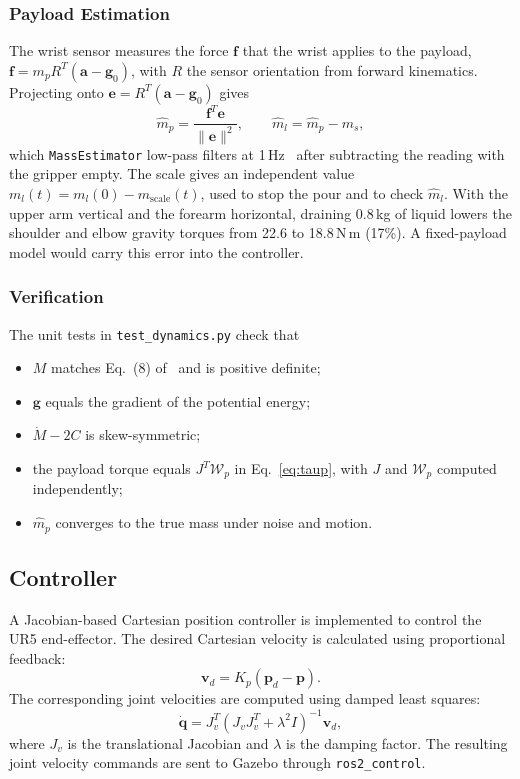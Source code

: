 \documentclass[conference]{IEEEtran}
\begin{document}
\subsubsection{Payload Estimation}
The wrist sensor measures the force $\mathbf f$ that the wrist applies to the payload, 
$\mathbf f=m_p R^T(\mathbf a-\mathbf g_0)$, with $R$ the sensor orientation from forward kinematics. 
Projecting onto $\mathbf e=R^T(\mathbf a-\mathbf g_0)$ gives
\begin{equation}
    \hat m_p=\frac{\mathbf f^T\mathbf e}{\lVert\mathbf e\rVert^2},
    \qquad \hat m_l=\hat m_p-m_s ,
\end{equation}
which \texttt{MassEstimator} low-pass filters at 1\,Hz~\cite{babaians2022} after subtracting the 
reading with the gripper empty. The scale gives an independent value $m_l(t)=m_l(0)-m_{\text{scale}}(t)$, 
used to stop the pour and to check $\hat m_l$. With the upper arm vertical and the forearm horizontal, 
draining 0.8\,kg of liquid lowers the shoulder and elbow gravity torques from 22.6 to 18.8\,N\,m (17\%). 
A fixed-payload model would carry this error into the controller.

\subsubsection{Verification}
The unit tests in \texttt{test\_dynamics.py} check that
\begin{itemize}
    \item $M$ matches Eq.~(8) of~\cite{kebria2016} and is positive definite;
    \item $\mathbf g$ equals the gradient of the potential energy;
    \item $\dot M-2C$ is skew-symmetric;
    \item the payload torque equals $J^T\mathcal W_p$ in
          Eq.~\eqref{eq:taup}, with $J$ and $\mathcal W_p$ computed
          independently;
    \item $\hat m_p$ converges to the true mass under noise and motion.
\end{itemize}

\subsection{Controller}
A Jacobian-based Cartesian position controller
is implemented to control the UR5 end-effector.
The desired Cartesian velocity is calculated
using proportional feedback:
\begin{equation}
    \mathbf{v}_d =
    K_p(\mathbf{p}_d-\mathbf{p}).
\end{equation}
The corresponding joint velocities are computed
using damped least squares:
\begin{equation}
    \dot{\mathbf{q}} =
    J_v^T(J_vJ_v^T+\lambda^2I)^{-1}
    \mathbf{v}_d,
\end{equation}
where $J_v$ is the translational Jacobian and
$\lambda$ is the damping factor. The resulting
joint velocity commands are sent to Gazebo
through \texttt{ros2\_control}.
\end{document}
